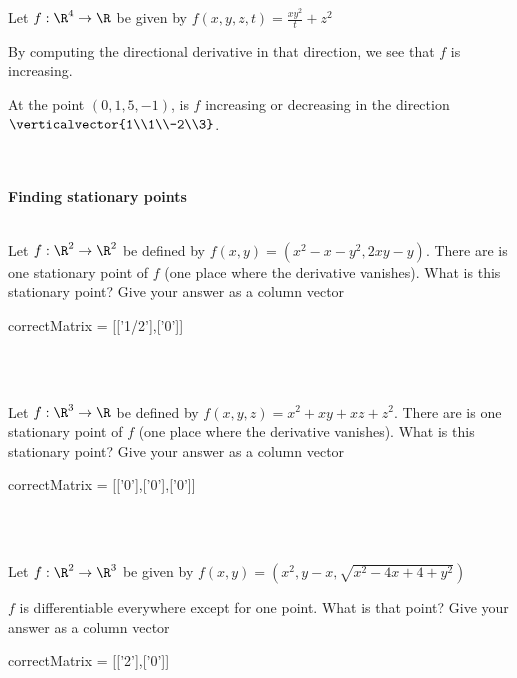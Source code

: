 \documentclass{ximera}
\begin{document}
	\begin{question}
		Let $f:\R^4 \to \R$ be given by $f(x,y,z,t)=\frac{xy^2}{t}+z^2$
		\begin{solution}
			\begin{hint}
				By computing the directional derivative in that direction, we see that $f$ is increasing.
			\end{hint}
			At the point $(0,1,5,-1)$, is $f$ increasing or decreasing in the direction $\verticalvector{1\\1\\-2\\3}$.
			\begin{multiple-choice}
			\end{multiple-choice}
		\end{solution}
	\end{question}
	\\
	\\
	\textbf{Finding stationary points}
	\\
	\\
	\begin{question}
		Let $f:\R^2 \to \R^2$ be defined by $f(x,y) = (x^2-x-y^2,2xy-y) $.
		There are is one stationary point of $f$ (one place where the derivative vanishes).  
		What is this stationary point?  Give your answer as a column vector
		 
		 \begin{matrix-answer}
		 correctMatrix = [['1/2'],['0']]
		 \end{matrix-answer}
	\end{question}
	\\
	\\
	\begin{question}
		Let $f:\R^3 \to \R$ be defined by $f(x,y,z) = x^2+xy+xz+z^2 $.
		There are is one stationary point of $f$ (one place where the derivative vanishes).  
		What is this stationary point?  Give your answer as a column vector
		 
		 \begin{matrix-answer}
		 correctMatrix = [['0'],['0'],['0']]
		 \end{matrix-answer}
	\end{question}
	\\
	\\
	\begin{question}
		Let $f:\R^2 \to \R^3$ be given by $f(x,y) = (x^2,y-x,\sqrt{x^2-4x+4+y^2})$
		\begin{question}
			$f$ is differentiable everywhere except for one point.  What is that point?  Give your answer as a column vector
			\begin{matrix-answer}
			correctMatrix = [['2'],['0']]
			\end{matrix-answer}
		\end{question}
	\end{question}
\end{document}
